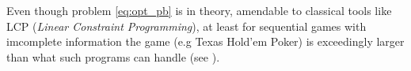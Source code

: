 \documentclass{article} %
\begin{document}
Even though problem \eqref{eq:opt_pb} is in theory, amendable to classical tools like LCP (\textit{Linear Constraint Programming}), at least for sequential games with imcomplete information the game (e.g Texas Hold'em Poker) is exceedingly larger than what such programs can handle (see \cite{hoda2010smoothing}).


\end{document}
